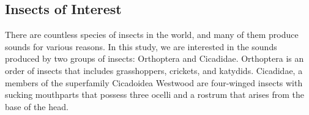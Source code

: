 \subsection{Insects of Interest}%

There are countless species of insects in the world, and many of them produce sounds for various reasons.
In this study, we are interested in the sounds produced by two groups of insects: Orthoptera and Cicadidae.
Orthoptera is an order of insects that includes grasshoppers, crickets, and katydids. \autocite{capineraOrthoptera2008}
Cicadidae, a members of the superfamily Cicadoidea Westwood are four-winged insects with sucking 
mouthparts that possess three ocelli and a rostrum that arises from the base of the head. \autocite{sanbornCicadasHemipteraCicadoidea2008}





